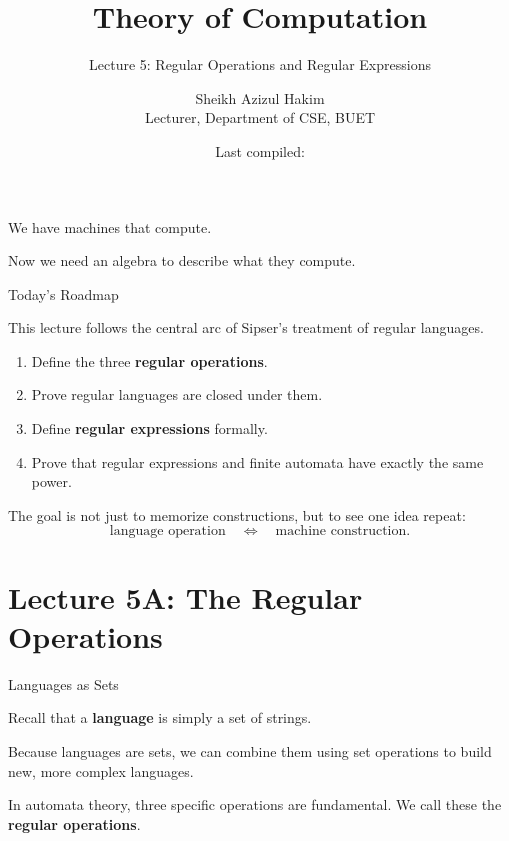\documentclass[10pt,aspectratio=169]{beamer}
\title{Theory of Computation}
\subtitle{Lecture 5: Regular Operations and Regular Expressions}
\author{Sheikh Azizul Hakim\\Lecturer, Department of CSE, BUET}
\date{Last compiled: \LastCompiled}
\begin{document}
\maketitle

\begin{frame}[standout]
We have machines that compute.

Now we need an algebra to describe what they compute.
\end{frame}


\begin{frame}{Today's Roadmap}

This lecture follows the central arc of Sipser's treatment of regular languages.

\vspace{0.7em}
\begin{enumerate}
    \item Define the three \textbf{regular operations}.
    \item Prove regular languages are closed under them.
    \item Define \textbf{regular expressions} formally.
    \item Prove that regular expressions and finite automata have exactly the same power.
\end{enumerate}

\vspace{0.7em}
The goal is not just to memorize constructions, but to see one idea repeat:
\[
\text{language operation} \quad \Longleftrightarrow \quad \text{machine construction}.
\]

\end{frame}


\section{Lecture 5A: The Regular Operations}

\begin{frame}{Languages as Sets}

Recall that a \textbf{language} is simply a set of strings.

\vspace{1em}

Because languages are sets, we can combine them using set operations to build new, more complex languages.

\vspace{1em}

In automata theory, three specific operations are fundamental. We call these the \textbf{regular operations}.

\end{frame}
\end{document}
